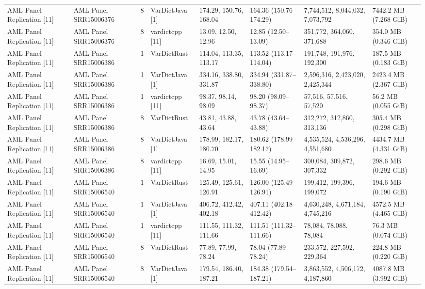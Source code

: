 \begin{table}[htbp]
{\begin{tabular}{llllllll}
AML Panel Replication [11] & AML Panel SRR15006376 & 8 & VarDictJava [1] & 174.29, 150.76, 168.04 & 164.36 (150.76--174.29) & 7,744,512, 8,044,032, 7,073,792 & 7442.2 MB (7.268 GiB) \\
AML Panel Replication [11] & AML Panel SRR15006376 & 8 & vardictcpp [11] & 13.09, 12.50, 12.96 & 12.85 (12.50--13.09) & 351,772, 364,060, 371,688 & 354.0 MB (0.346 GiB) \\
AML Panel Replication [11] & AML Panel SRR15006386 & 1 & VarDictRust & 114.04, 113.35, 113.17 & 113.52 (113.17--114.04) & 191,748, 191,976, 192,300 & 187.5 MB (0.183 GiB) \\
AML Panel Replication [11] & AML Panel SRR15006386 & 1 & VarDictJava [1] & 334.16, 338.80, 331.87 & 334.94 (331.87--338.80) & 2,596,316, 2,423,020, 2,425,344 & 2423.4 MB (2.367 GiB) \\
AML Panel Replication [11] & AML Panel SRR15006386 & 1 & vardictcpp [11] & 98.37, 98.14, 98.09 & 98.20 (98.09--98.37) & 57,516, 57,516, 57,520 & 56.2 MB (0.055 GiB) \\
AML Panel Replication [11] & AML Panel SRR15006386 & 8 & VarDictRust & 43.81, 43.88, 43.64 & 43.78 (43.64--43.88) & 312,272, 312,860, 313,136 & 305.4 MB (0.298 GiB) \\
AML Panel Replication [11] & AML Panel SRR15006386 & 8 & VarDictJava [1] & 178.99, 182.17, 180.70 & 180.62 (178.99--182.17) & 4,535,524, 4,536,296, 4,551,680 & 4434.7 MB (4.331 GiB) \\
AML Panel Replication [11] & AML Panel SRR15006386 & 8 & vardictcpp [11] & 16.69, 15.01, 14.95 & 15.55 (14.95--16.69) & 300,084, 309,872, 307,332 & 298.6 MB (0.292 GiB) \\
AML Panel Replication [11] & AML Panel SRR15006540 & 1 & VarDictRust & 125.49, 125.61, 126.91 & 126.00 (125.49--126.91) & 199,412, 199,396, 199,072 & 194.6 MB (0.190 GiB) \\
AML Panel Replication [11] & AML Panel SRR15006540 & 1 & VarDictJava [1] & 406.72, 412.42, 402.18 & 407.11 (402.18--412.42) & 4,630,248, 4,671,184, 4,745,216 & 4572.5 MB (4.465 GiB) \\
AML Panel Replication [11] & AML Panel SRR15006540 & 1 & vardictcpp [11] & 111.55, 111.32, 111.66 & 111.51 (111.32--111.66) & 78,084, 78,088, 78,084 & 76.3 MB (0.074 GiB) \\
AML Panel Replication [11] & AML Panel SRR15006540 & 8 & VarDictRust & 77.89, 77.99, 78.24 & 78.04 (77.89--78.24) & 233,572, 227,592, 229,364 & 224.8 MB (0.220 GiB) \\
AML Panel Replication [11] & AML Panel SRR15006540 & 8 & VarDictJava [1] & 179.54, 186.40, 187.21 & 184.38 (179.54--187.21) & 3,863,552, 4,506,172, 4,187,860 & 4087.8 MB (3.992 GiB) \\

\end{tabular}}
\end{table}
